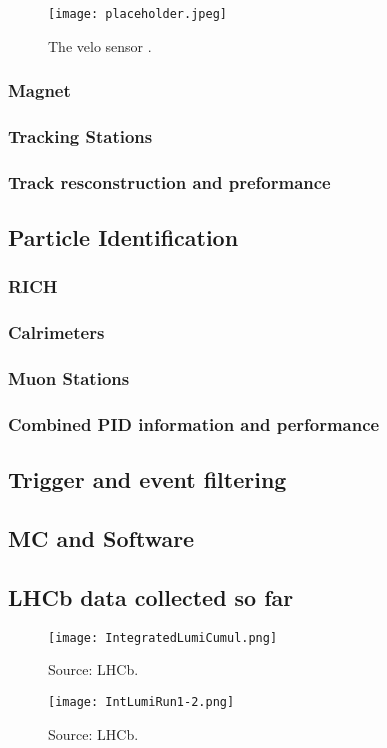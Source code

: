 \begin{figure}[tb] 
  \centering    
  \texttt{[image: placeholder.jpeg]}
  \caption{The velo sensor \cite{Alves:2008zz}.}
  \label{fig:velo_sensor}
\end{figure}

\subsubsection{Magnet}

\subsubsection{Tracking Stations} %

\subsubsection{Track resconstruction and preformance}


\subsection{Particle Identification}
\subsubsection{RICH}
\subsubsection{Calrimeters}
\subsubsection{Muon Stations}
\subsubsection{Combined PID information and performance}

\subsection{Trigger and event filtering}

\subsection{MC and Software}

\subsection{LHCb data collected so far}

\begin{figure}[tb] 
  \centering    
  \texttt{[image: IntegratedLumiCumul.png]}
  \caption{Source: LHCb.}
  \label{fig:cumulative_lumi}
\end{figure}

\begin{figure}[tb] 
  \centering    
  \texttt{[image: IntLumiRun1-2.png]}
  \caption{Source: LHCb.}
  \label{fig:yearly_lumi}
\end{figure}
